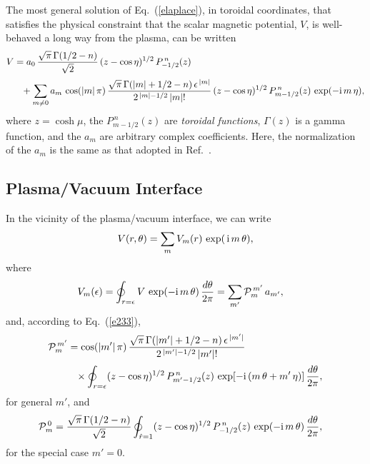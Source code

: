 \documentclass[12pt,prb,aps]{revtex4-1}
\begin{document}
 The most general solution of Eq.~(\ref{elaplace}), in toroidal coordinates, that satisfies the physical constraint that the scalar magnetic
 potential, $V$,    is well-behaved a long way from the plasma, can be written\,\cite{morse1}
\begin{align}\label{e233}
V &=
 a_0\,\frac{\sqrt{\pi}\,\Gamma(1/2-n)}{\sqrt{2}}\,(z-\cos\eta)^{1/2}\,P_{-1/2}^{\,n}(z) \\[0.5ex]
&\phantom{=}+\sum_{m\neq 0} a_m\,\cos(|m|\,\pi)\,
\frac{\sqrt{\pi}\,\Gamma(|m|+1/2-n)\,\epsilon^{\,|m|}}{2^{\,|m|-1/2}\,|m|!}
\,(z-\cos\eta)^{1/2}\,P_{m-1/2}^{\,n}(z) \,\exp(-{\rm i}\,m\,\eta),\nonumber
\end{align}
where $z=\cosh\mu$, the $P_{m-1/2}^{\,n}(z)$ are {\em toroidal functions},\cite{abrama}  $\Gamma(z)$ is a
gamma function,\cite{abramb} and the $a_m$ are arbitrary complex coefficients.
Here, the normalization of the $a_m$ is the same as that adopted in Ref.~.

\subsection{Plasma/Vacuum Interface}
In the vicinity of the plasma/vacuum interface, we can write
\begin{equation}\label{e193tt}
V(r,\theta) = \sum_m V_m(r)\,\exp(\,{\rm i}\,m\,\theta),
\end{equation}
where
\begin{align}\label{e344}
V_m (\epsilon)&= \oint_{r=\epsilon}V\,\exp(-{\rm i}\,m\,\theta)\,\frac{d\theta}{2\pi}= \sum_{m'}{\cal P}_m^{\,m'}\,a_{m'},
\end{align}
and, according to Eq.~(\ref{e233}), 
\begin{align}
{\cal P}_m^{\,m'} &=
\cos(|m'|\,\pi)\,\frac{\sqrt{\pi}\,\Gamma(|m'|+1/2-n)\,\epsilon^{\,|m'|}}{2^{\,|m'|-1/2}\,|m'|!}\nonumber\\[0.5ex]
&\phantom{=}\times
\oint_{r=\epsilon}(z-\cos\eta)^{1/2}\,P_{m'-1/2}^{\,n}(z)\,\exp[-{\rm i}\,(m\,\theta+m'\,\eta)]\,\frac{d\theta}{2\pi},\label{e346}
\end{align}
for general $m'$, and 
\begin{align}
{\cal P}_m^{\,0} &=
\frac{\sqrt{\pi}\,\Gamma(1/2-n)}{\sqrt{2}}\oint_{\hat{r}=1}
(z-\cos\eta)^{1/2}\,P_{-1/2}^{\,n}(z)\,\exp(-{\rm i}\,m\,\theta)\,\frac{d\theta}{2\pi},\label{e348}
\end{align}
for the special case $m'=0$. 
\end{document}
